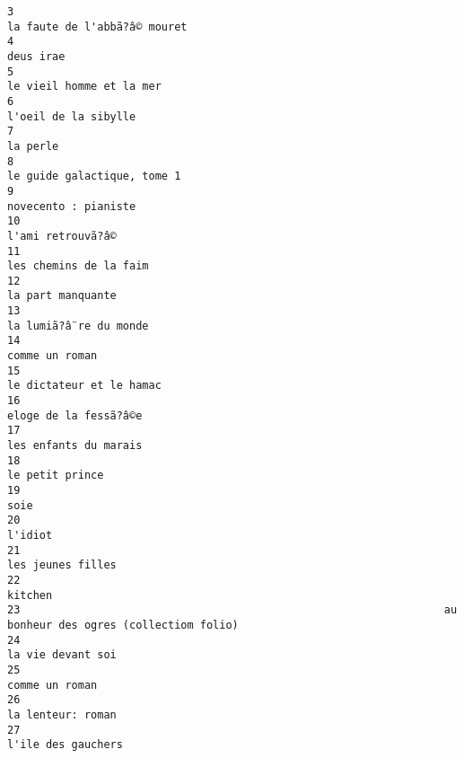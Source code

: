 \documentclass[
]{report}
\begin{document}
\begin{verbatim}
3                                                                              la faute de l'abbã?â© mouret
4                                                                                                 deus irae
5                                                                                  le vieil homme et la mer
6                                                                                      l'oeil de la sibylle
7                                                                                                  la perle
8                                                                               le guide galactique, tome 1
9                                                                                      novecento : pianiste
10                                                                                        l'ami retrouvã?â©
11                                                                                   les chemins de la faim
12                                                                                        la part manquante
13                                                                                   la lumiã?â¨re du monde
14                                                                                           comme un roman
15                                                                                 le dictateur et le hamac
16                                                                                    eloge de la fessã?â©e
17                                                                                    les enfants du marais
18                                                                                          le petit prince
19                                                                                                     soie
20                                                                                                  l'idiot
21                                                                                        les jeunes filles
22                                                                                                  kitchen
23                                                                  au bonheur des ogres (collectiom folio)
24                                                                                        la vie devant soi
25                                                                                           comme un roman
26                                                                                        la lenteur: roman
27                                                                                       l'ile des gauchers

\end{verbatim}
\end{document}

